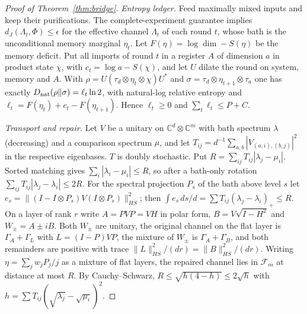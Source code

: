 \documentclass[11pt,a4paper]{article}
\theoremstyle{plain}
\theoremstyle{definition}
\theoremstyle{remark}
\newcommand{\dJ}{d_J}
\begin{document}
\begin{proof}[Proof of Theorem~\ref{thm:bridge}]
\emph{Entropy ledger.} Feed maximally mixed inputs and keep their purifications. The complete-experiment guarantee
implies $\dJ(\Lambda_t,\Phi)\le\epsilon$ for the effective channel $\Lambda_t$ of each round $t$, whose bath is the
unconditional memory marginal $\eta_t$. Let $F(\eta)=\log\dim-S(\eta)$ be the memory deficit. Put all imports of round
$t$ in a register $A$ of dimension $a$ in product state $\chi$, with $c_t=\log a-S(\chi)$, and let $U$ dilate the
round on system, memory and $A$. With $\rho=U(\tau_d\otimes\eta_t\otimes\chi)U^*$ and
$\sigma=\tau_d\otimes\eta_{t+1}\otimes\tau_a$ one has exactly $D_{\rm nat}(\rho\|\sigma)=\ell_t\ln2$, with natural-log relative entropy and
$\ell_t=F(\eta_t)+c_t-F(\eta_{t+1})$. Hence $\ell_t\ge0$ and $\sum_t\ell_t\le P+C$.

\emph{Transport and repair.} Let $V$ be a unitary on $\mathbb{C}^d\otimes\mathbb{C}^m$ with bath spectrum $\lambda$
(decreasing) and a comparison spectrum $\mu$, and let
$T_{ij}=d^{-1}\sum_{a,b}|V_{(a,i),(b,j)}|^2$ in the respective eigenbases. $T$ is doubly stochastic. Put
$R=\sum_{ij}T_{ij}|\lambda_j-\mu_i|$. Sorted matching gives $\sum_i|\lambda_i-\mu_i|\le R$, so after a bath-only
rotation $\sum_{ij}T_{ij}|\lambda_j-\lambda_i|\le2R$. For the spectral projection $P_s$ of the bath above level $s$
let $e_s=\|(I-I\otimes P_s)V(I\otimes P_s)\|_{HS}^2$; then $\int e_s\,ds/d=\sum T_{ij}(\lambda_j-\lambda_i)_+\le R$.
On a layer of rank $r$ write $A=PVP=VH$ in polar form, $B=V\sqrt{I-H^2}$ and $W_\pm=A\pm iB$. Both $W_\pm$ are unitary,
the original channel on the flat layer is $\Gamma_A+\Gamma_L$ with $L=(I-P)VP$, the mixture of $W_\pm$ is
$\Gamma_A+\Gamma_B$, and both remainders are positive with trace $\|L\|_{HS}^2/(dr)=\|B\|_{HS}^2/(dr)$. Writing
$\eta=\sum_jw_jP_j/j$ as a mixture of flat layers, the repaired channel lies in $\mathcal{F}_m$ at distance at most
$R$. By Cauchy--Schwarz, $R\le\sqrt{h(4-h)}\le2\sqrt h$ with $h=\sum T_{ij}(\sqrt{\lambda_j}-\sqrt{\mu_i})^2$.


\end{proof}
\end{document}
